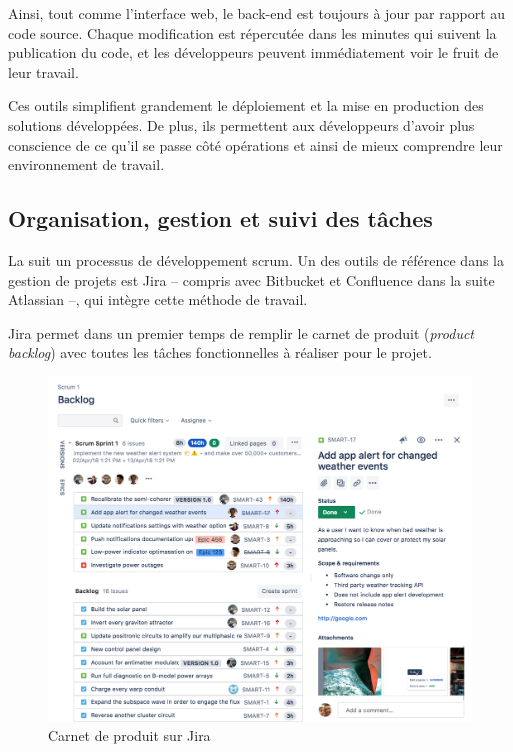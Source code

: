 Ainsi, tout comme l'interface web, le \gls{back-end} est toujours à jour par rapport au code source. Chaque modification est répercutée dans les minutes qui suivent la publication du code, et les développeurs peuvent immédiatement voir le fruit de leur travail.

Ces outils simplifient grandement le déploiement et la mise en production des solutions développées. De plus, ils permettent aux développeurs d'avoir plus conscience de ce qu'il se passe côté opérations et ainsi de mieux comprendre leur environnement de travail.

\newpage
\subsection{Organisation, gestion et suivi des tâches}

La \df suit un processus de développement \gls{scrum}. Un des outils de référence dans la gestion de projets est Jira -- compris avec Bitbucket et Confluence dans la suite Atlassian --, qui intègre cette méthode de travail.

Jira permet dans un premier temps de remplir le carnet de produit (\textit{product backlog}) avec toutes les tâches fonctionnelles à réaliser pour le projet.


  \begin{figure}[H]
    \centering
    \includegraphics[width=1\linewidth]{img/jira_Scrum_backlog.png}
    \caption{Carnet de produit sur Jira}
  \end{figure}

